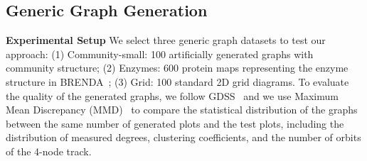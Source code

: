 \documentclass{article}
\begin{document}
\subsection{Generic Graph Generation}
\textbf{Experimental Setup} We select three generic graph datasets to test our approach: (1) Community-small: 100 artificially generated graphs with community structure; (2) Enzymes: 600 protein maps representing the enzyme structure in BRENDA~\citep{schomburg2004brenda}; (3) Grid: 100 standard 2D grid diagrams. To evaluate the quality of the generated graphs, we follow GDSS~\citep{jo2022GDSS} and we use Maximum Mean Discrepancy (MMD)~\citep{MMDgretton12a,you2018graphrnn} to compare the statistical distribution of the graphs between the same number of generated plots and the test plots, including the distribution of measured degrees, clustering coefficients, and the number of orbits of the 4-node track.
\end{document}
